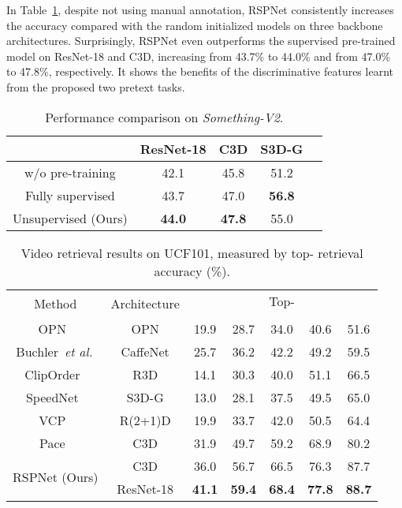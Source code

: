\documentclass[final]{cvpr}
\def\etal{{\em et al.\/}\, }
\begin{document}
In Table~\ref{tab:something}, despite not using manual annotation, RSPNet consistently increases the accuracy compared with the random initialized models on three backbone architectures. Surprisingly, RSPNet even outperforms the supervised pre-trained model on ResNet-18 and C3D, increasing from 43.7\% to 44.0\% and from 47.0\% to 47.8\%, respectively. It shows the benefits of the discriminative features learnt from the proposed two pretext tasks.

\begin{table}[t]
	\centering
	\caption{Performance comparison on \emph{Something-V2}. }
	\label{tab:something}
	\begin{tabular}{ccccc}
		\hline
		& ResNet-18 & C3D & S3D-G \\ \hline
		w/o pre-training        &   42.1  & 45.8  & 51.2   \\ 
		Fully supervised          &   43.7  & 47.0  & \textbf{56.8} \\ \hline
		Unsupervised (Ours)    &\textbf{44.0}    & \textbf{47.8}  & 55.0 \\
		\hline
	\end{tabular}
\end{table}	


\begin{table*}[ht]
	\centering
	\caption{Video retrieval results on UCF101, measured by top- retrieval accuracy (\%).}
	\label{tab:retri_acc}
	\begin{tabular}{ccccccc}
\hline
		\multirow{2}[0]{*}{Method} & \multirow{2}[0]{*}{Architecture} &
		\multicolumn{5}{c}{Top-} \\
		\cline{3-7}
		& &     &     &    &    &      \\ 
\hline
		OPN~\cite{lee2017unsupervised}      & OPN               & 19.9 & 28.7 & 34.0 & 40.6 & 51.6   \\
		Buchler~\etal\cite{buchler2018improving}  & CaffeNet          & 25.7 & 36.2 & 42.2 & 49.2 & 59.5   \\
		ClipOrder~\cite{xu2019self}    & R3D               & 14.1 & 30.3 & 40.0 & 51.1 & 66.5   \\
		SpeedNet~\cite{speednet} & S3D-G             & 13.0 & 28.1 & 37.5 & 49.5 & 65.0   \\
		VCP~\cite{vcp}       & R(2+1)D           & 19.9  & 33.7  & 42.0 & 50.5  & 64.4   \\
		Pace~\cite{pace}     & C3D               & 31.9  & 49.7  & 59.2 & 68.9  & 80.2   \\
		\hline
		\multirow{2}{*}{RSPNet (Ours)}    
		& C3D               & 36.0           & 56.7          & 66.5          & 76.3           & 87.7   \\
		& ResNet-18         & \textbf{41.1}  & \textbf{59.4} & \textbf{68.4} & \textbf{77.8}  & \textbf{88.7}   \\
		
\hline
	\end{tabular}
\end{table*}
\end{document}
